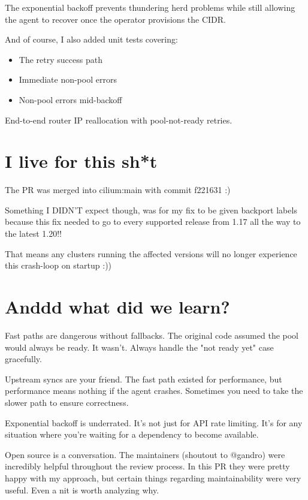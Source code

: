 The exponential backoff prevents thundering herd problems while still allowing the agent to recover once the operator provisions the CIDR.

And of course, I also added unit tests covering:

\begin{itemize}
\item The retry success path

\item Immediate non-pool errors

\item Non-pool errors mid-backoff
\end{itemize}

End-to-end router IP reallocation with pool-not-ready retries.

\section{I live for this sh*t}

The PR was merged into cilium:main with commit f221631 :)

Something I DIDN'T expect though, was for my fix to be given backport labels because this fix needed to go to every supported release from 1.17 all the way to the latest 1.20!!


That means any clusters running the affected versions will no longer experience this crash-loop on startup :))

\section{Anddd what did we learn?}

Fast paths are dangerous without fallbacks. The original code assumed the pool would always be ready. It wasn't. Always handle the "not ready yet" case gracefully.

Upstream syncs are your friend. The fast path existed for performance, but performance means nothing if the agent crashes. Sometimes you need to take the slower path to ensure correctness.

Exponential backoff is underrated. It's not just for API rate limiting. It's for any situation where you're waiting for a dependency to become available.

Open source is a conversation. The maintainers (shoutout to @gandro) were incredibly helpful throughout the review process. In this PR they were pretty happy with my approach, but certain things regarding maintainability were very useful. Even a nit is worth analyzing why.

